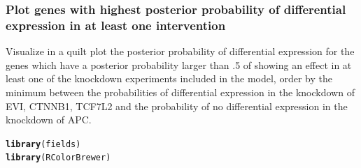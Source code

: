 \documentclass[a4paper]{article}
\makeatletter
\newcommand{\hlstd}[1]{\textcolor[rgb]{0.345,0.345,0.345}{#1}}%
\newcommand{\hlkwd}[1]{\textcolor[rgb]{0.737,0.353,0.396}{\textbf{#1}}}%
\newenvironment{kframe}{%
 \def\at@end@of@kframe{}%
 \ifinner\ifhmode%
  \def\at@end@of@kframe{\end{minipage}}%
  \begin{minipage}{\columnwidth}%
 \fi\fi%
 \def\FrameCommand##1{\hskip\@totalleftmargin \hskip-\fboxsep
 \colorbox{shadecolor}{##1}\hskip-\fboxsep
     \hskip-\linewidth \hskip-\@totalleftmargin \hskip\columnwidth}%
 \MakeFramed {\advance\hsize-\width
   \@totalleftmargin\z@ \linewidth\hsize
   \@setminipage}}%
 {\par\unskip\endMakeFramed%
 \at@end@of@kframe}
\newenvironment{knitrout}{}{} %
\makeatother
\begin{document}

\subsubsection*{Plot genes with highest posterior probability of differential expression in at least one intervention}
Visualize in a quilt plot the posterior probability of differential expression for the genes which have a posterior probability larger than .5 of showing an effect in at least one of the knockdown experiments included in the model, order by the minimum between the probabilities of differential expression in the knockdown of EVI, CTNNB1, TCF7L2 and the probability of no differential expression in the knockdown of APC.

\begin{knitrout}
\color{fgcolor}\begin{kframe}
\begin{alltt}
\hlkwd{library}\hlstd{(fields)}
\hlkwd{library}\hlstd{(RColorBrewer)}
\end{alltt}
\end{kframe}
\end{knitrout}
\end{document}
